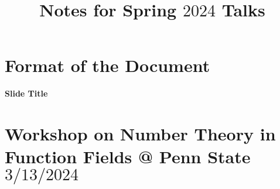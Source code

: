 \documentclass[11pt]{amsart}
\theoremstyle{definition}
\numberwithin{equation}{section}
\begin{document}
	
	\title{Notes for Spring $2024$ Talks}
	
	\maketitle
	
	\section*{Format of the Document}
	\textbf{Slide Title}\\
	
	\section{Workshop on Number Theory in Function Fields @ Penn State $3/13/2024$}
	
\end{document}
